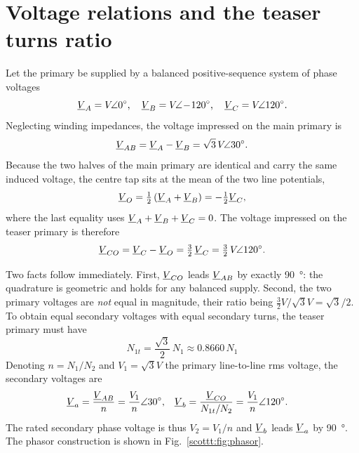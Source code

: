 \section{Voltage relations and the teaser turns ratio}

Let the primary be supplied by a balanced positive-sequence system of phase
voltages
\begin{equation}
\underline{V}_A = V\!\angle 0^\circ,\quad
\underline{V}_B = V\!\angle\!-\!120^\circ,\quad
\underline{V}_C = V\!\angle 120^\circ .
\end{equation}
Neglecting winding impedances, the voltage impressed on the main primary is
\begin{equation}
\underline{V}_{AB} = \underline{V}_A - \underline{V}_B = \sqrt{3}\,V\!\angle 30^\circ .
\end{equation}
Because the two halves of the main primary are identical and carry the same
induced voltage, the centre tap sits at the mean of the two line potentials,
\begin{equation}
\underline{V}_O = \tfrac{1}{2}\left(\underline{V}_A + \underline{V}_B\right) = -\tfrac{1}{2}\underline{V}_C ,
\end{equation}
where the last equality uses $\underline{V}_A+\underline{V}_B+\underline{V}_C = 0$. The voltage
impressed on the teaser primary is therefore
\begin{equation}
\underline{V}_{CO} = \underline{V}_C - \underline{V}_O = \tfrac{3}{2}\,\underline{V}_C
            = \tfrac{3}{2}\,V\!\angle 120^\circ .
\end{equation}

Two facts follow immediately. First, $\underline{V}_{CO}$ leads $\underline{V}_{AB}$ by
exactly \SI{90}{\degree}: the quadrature is geometric and holds for any balanced
supply. Second, the two primary voltages are \emph{not} equal in magnitude,
their ratio being $\tfrac{3}{2}V / \sqrt{3}V = \sqrt{3}/2$. To obtain equal
secondary voltages with equal secondary turns, the teaser primary must have
\begin{equation}
\boxed{\;N_{1t} = \frac{\sqrt{3}}{2}\,N_1 \approx 0.8660\,N_1\;}
\end{equation}
Denoting $n = N_1/N_2$ and $V_1 = \sqrt{3}V$ the primary line-to-line rms
voltage, the secondary voltages are
\begin{align}
\underline{V}_a &= \frac{\underline{V}_{AB}}{n} = \frac{V_1}{n}\angle 30^\circ, &
\underline{V}_b &= \frac{\underline{V}_{CO}}{N_{1t}/N_2} = \frac{V_1}{n}\angle 120^\circ .
\end{align}
The rated secondary phase voltage is thus $V_2 = V_1/n$ and $\underline{V}_b$ leads
$\underline{V}_a$ by \SI{90}{\degree}. The phasor construction is shown in
Fig.~\ref{scottt:fig:phasor}.

